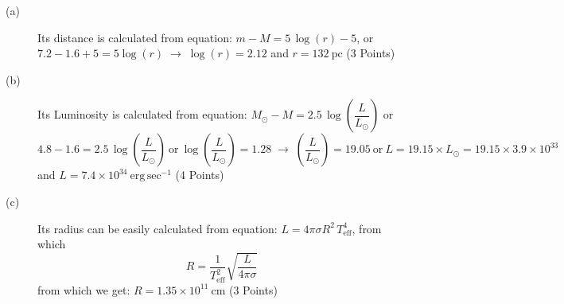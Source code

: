 \begin{description}
\item[(a)] Its distance is calculated from equation: $m - M = 5\,\log(r) - 5$,
  or $7.2 - 1.6 + 5 = 5\log(r) \;\rightarrow\; \log(r) = 2.12$ and
  $r = 132\ \mathrm{pc}$
  \hfill(3 Points)
\item[(b)] Its Luminosity is calculated from equation:
  $M_\odot - M = 2.5\,\log\!\left(\dfrac{L}{L_\odot}\right)$ or
  \[
    4.8 - 1.6 = 2.5\,\log\!\left(\frac{L}{L_\odot}\right)
    \ \text{or}\
    \log\!\left(\frac{L}{L_\odot}\right) = 1.28
    \;\rightarrow\;
    \left(\frac{L}{L_\odot}\right) = 19.05
    \ \text{or}\
    L = 19.15\times L_\odot %
    = 19.15\times3.9\times10^{33}
  \]
  and $L = 7.4\times10^{34}\ \mathrm{erg\,sec^{-1}}$
  \hfill(4 Points)
\item[(c)] Its radius can be easily calculated from equation:
  $L = 4\pi\sigma R^2\,T_{\mathrm{eff}}^4$, from which
  \[
    R = \frac{1}{T_{\mathrm{eff}}^2}\sqrt{\frac{L}{4\pi\sigma}}
  \]
  from which we get: $R = 1.35\times10^{11}\ \mathrm{cm}$
  \hfill(3 Points)
\end{description}
